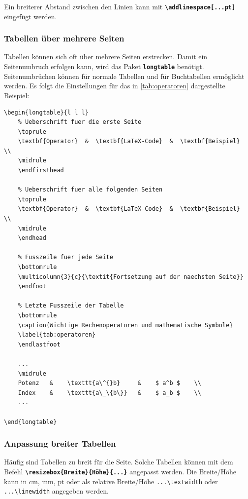 Ein breiterer Abstand zwischen den Linien kann mit \textbf{\texttt{\textbackslash addlinespace[...pt]}} eingefügt werden.

\newpage

\subsubsection{Tabellen über mehrere Seiten}
Tabellen können sich oft über mehrere Seiten erstrecken. Damit ein Seitenumbruch erfolgen kann, wird das Paket \textbf{\texttt{longtable}} benötigt. Seitenumbrüchen können für normale Tabellen und für Buchtabellen ermöglicht werden. Es folgt die Einstellungen für das in \autoref{tab:operatoren} dargestellte Beispiel:

\begin{lstlisting}[language={[LaTeX]TeX}, emph={\endfirsthead,\endhead,\endfoot,\endlastfoot}, emphstyle={\color{red}}]
\begin{longtable}{l l l}
    % Ueberschrift fuer die erste Seite
    \toprule
    \textbf{Operator}  &  \textbf{LaTeX-Code}  &  \textbf{Beispiel}  \\
    \midrule
    \endfirsthead

    % Ueberschrift fuer alle folgenden Seiten
    \toprule
    \textbf{Operator}  &  \textbf{LaTeX-Code}  &  \textbf{Beispiel}  \\
    \midrule
    \endhead

    % Fusszeile fuer jede Seite
    \bottomrule
    \multicolumn{3}{c}{\textit{Fortsetzung auf der naechsten Seite}}
    \endfoot

    % Letzte Fusszeile der Tabelle
    \bottomrule
    \caption{Wichtige Rechenoperatoren und mathematische Symbole}
    \label{tab:operatoren}
    \endlastfoot

    ... 
    \midrule
    Potenz   &    \texttt{a\^{}b}     &    $ a^b $    \\
    Index    &    \texttt{a\_\{b\}}   &    $ a_b $    \\
    ... 

\end{longtable}
\end{lstlisting}

\subsubsection{Anpassung breiter Tabellen}
Häufig sind Tabellen zu breit für die Seite. Solche Tabellen können mit dem Befehl \textbf{\texttt{\textbackslash resizebox\{Breite\}\{Höhe\}\{...\}}} angepasst werden. Die Breite/Höhe kann in cm, mm, pt oder als relative Breite/Höhe \texttt{...\textbackslash textwidth} oder \texttt{...\textbackslash linewidth} angegeben werden.

